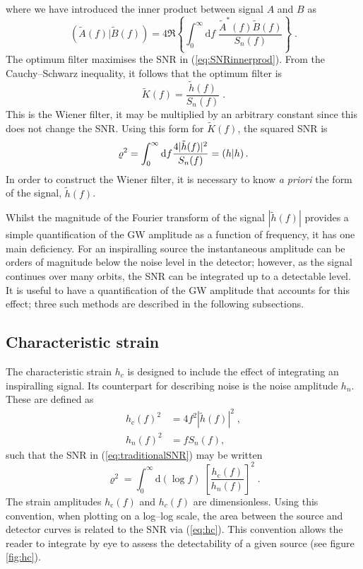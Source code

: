 where we have introduced the inner product between signal $A$ and $B$ as \citep{Finn1992}
\begin{equation}\label{eq:snrinnerprod} \left( \tilde{A}(f) | \tilde{B}(f) \right) = 4\Re\left\{\int_{0}^{\infty}\mathrm{d}f\;\frac{\tilde{A}^{*}(f)\tilde{B}(f)}{S_{n}(f)}\right\} \; .\end{equation}
The optimum filter maximises the SNR in (\ref{eq:SNRinnerprod}). From the Cauchy--Schwarz inequality, it follows that the optimum filter is
\begin{equation}
\tilde{K}(f)=\frac{\tilde{h}(f)}{S_{n}(f)} \; .
\end{equation}
This is the Wiener filter, it may be multiplied by an arbitrary constant since this does not change the SNR. Using this form for $\tilde{K}(f)$, the squared SNR is
\begin{equation}
\varrho^2 = \int_0^\infty\mathrm{d}f \frac{4| \tilde{h}(f)|^{2}}{S_n(f)} = \left({h}\middle|{h}\right).
\label{eq:traditionalSNR} 
\end{equation}
In order to construct the Wiener filter, it is necessary to know \emph{a priori} the form of the signal, $\tilde{h}(f)$.

Whilst the magnitude of the Fourier transform of the signal $|\tilde{h}(f)|$ provides a simple quantification of the GW amplitude as a function of frequency, it has one main deficiency. For an inspiralling source the instantaneous amplitude can be orders of magnitude below the noise level in the detector; however, as the signal continues over many orbits, the SNR can be integrated up to a detectable level. It is useful to have a quantification of the GW amplitude that accounts for this effect; three such methods are described in the following subsections.

\subsection{Characteristic strain}\label{sec:character-strain}

The characteristic strain $h_c$ is designed to include the effect of integrating an inspiralling signal. Its counterpart for describing noise is the noise amplitude $h_n$. These are defined as
\begin{eqnarray}\label{eq:strain-hc} 
h_\mathrm{c}(f)^{2} &= 4f^{2}\left| \tilde{h}(f) \right|^{2} \; ,\\
h_{n}(f)^{2} &= fS_{n}(f),
\label{eq:strain-hn}
\end{eqnarray}
such that the SNR in (\ref{eq:traditionalSNR}) may be written
\begin{equation}\label{eq:hc} 
\varrho^{2} = \int_{0}^{\infty} \mathrm{d}\left(\log f\right)\; \left[\frac{h_\mathrm{c}(f)}{h_{n}(f)}\right]^{2} \;.
\end{equation}
The strain amplitudes $h_\mathrm{c}(f)$ and $h_{c}(f)$ are dimensionless. Using this convention, when plotting on a log--log scale, the area between the source and detector curves is related to the SNR via (\ref{eq:hc}). This convention allows the reader to integrate by eye to assess the detectability of a given source (see figure \ref{fig:hc}).

